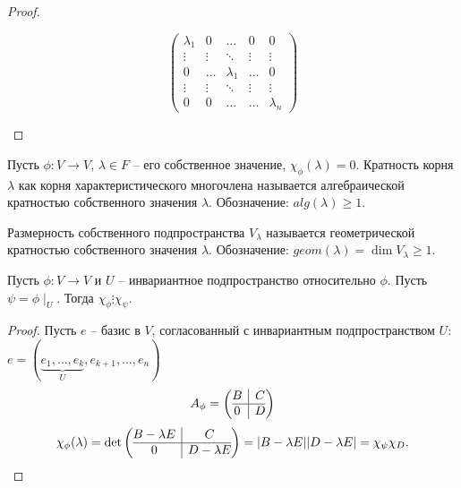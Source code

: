 \begin{proof}
\begin{enumerate}
\begin{equation*}
        \left(
            \begin{array}{ccccc}
            \lambda_{1} & 0 & \ldots & 0 & 0\\
            \vdots & \vdots & \ddots & \vdots & \vdots\\
            0 & \ldots & \lambda_{1} & \ldots & 0\\
            \vdots & \vdots & \ddots & \vdots & \vdots\\
            0 & 0 & \ldots & \ldots & \lambda_n
            \end{array}
        \right)
        \end{equation*}
    \end{enumerate}
\end{proof}

\begin{definition}
    Пусть $\phi: V \to V$, $\lambda \in F$ -- его собственное значение, $\chi_{\phi}(\lambda) = 0$.
    Кратность корня $\lambda$ как корня характеристического многочлена называется алгебраической 
    кратностью собственного значения $\lambda$. Обозначение: $alg(\lambda) \geq 1$.
\end{definition}

\begin{definition}
    Размерность собственного подпространства $V_{\lambda}$ называется геометрической кратностью 
    собственного значения $\lambda$. Обозначение: $geom(\lambda) = \dim V_{\lambda} \geq 1$.
\end{definition}

\begin{proposition}
    \label{pr4.1}
    Пусть $\phi: V \to V$ и $U$ -- инвариантное подпространство относительно $\phi$. 
    Пусть $\psi = \phi \mid_{U}$. Тогда $\chi_{\phi} \vdots \chi_{\psi}$.
\end{proposition}

\begin{proof}
    Пусть $e$ -- базис в $V$, согласованный с инвариантным подпространством $U$: 
    $e = (\underbrace{e_{1}, \dots, e_{k}}_{U}, e_{k + 1}, \dots, e_n)$
    \[A_{\phi} = \left(\begin{array}{@{}c|c@{}}
        B & C\\
        \hline
        0 & D
    \end{array}\right)\]
    \[\chi_{\phi}(\lambda) = \det \left(\begin{array}{@{}c|c@{}}
        B - \lambda E & C\\
        \hline
        0 & D - \lambda E
    \end{array}\right) = |B - \lambda E| |D - \lambda E| = \chi_{\psi} \chi_D.\]
\end{proof}

